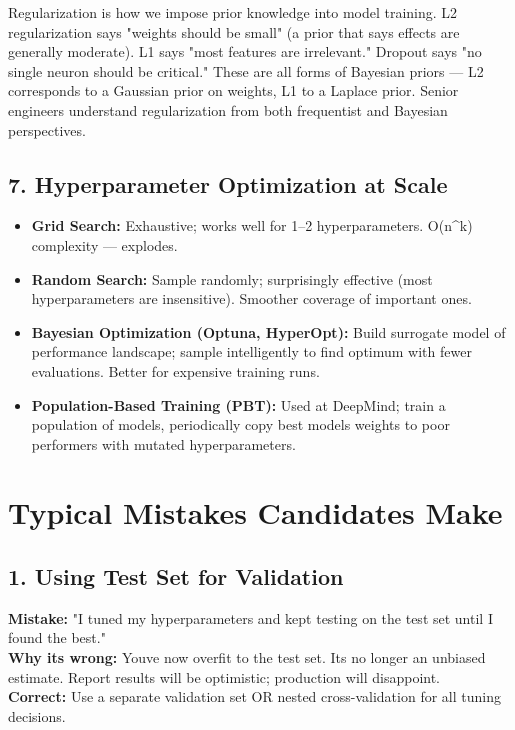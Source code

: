 \documentclass[11pt]{article}
\providecommand{\tightlist}{\setlength{\itemsep}{1pt}\setlength{\parskip}{0pt}}
\begin{document}
Regularization is how we impose prior knowledge into model training. L2 regularization says "weights should be small" (a prior that says effects are generally moderate). L1 says "most features are irrelevant." Dropout says "no single neuron should be critical." These are all forms of Bayesian priors --- L2 corresponds to a Gaussian prior on weights, L1 to a Laplace prior. Senior engineers understand regularization from both frequentist and Bayesian perspectives.

\subsection{7. Hyperparameter Optimization at Scale}\label{7-hyperparameter-optimization-at-scale}

\begin{itemize}
\tightlist
\item
  \textbf{Grid Search:} Exhaustive; works well for 1--2 hyperparameters. O(n\^{}k) complexity --- explodes.
\item
  \textbf{Random Search:} Sample randomly; surprisingly effective (most hyperparameters are insensitive). Smoother coverage of important ones.
\item
  \textbf{Bayesian Optimization (Optuna, HyperOpt):} Build surrogate model of performance landscape; sample intelligently to find optimum with fewer evaluations. Better for expensive training runs.
\item
  \textbf{Population-Based Training (PBT):} Used at DeepMind; train a population of models, periodically copy best model\textquotesingle s weights to poor performers with mutated hyperparameters.
\end{itemize}

\section{Typical Mistakes Candidates Make}\label{typical-mistakes-candidates-make}

\subsection{1. Using Test Set for Validation}\label{1-using-test-set-for-validation}

\textbf{Mistake:} "I tuned my hyperparameters and kept testing on the test set until I found the best."\\
\textbf{Why it\textquotesingle s wrong:} You\textquotesingle ve now overfit to the test set. It\textquotesingle s no longer an unbiased estimate. Report results will be optimistic; production will disappoint.\\
\textbf{Correct:} Use a separate validation set OR nested cross-validation for all tuning decisions.
\end{document}
